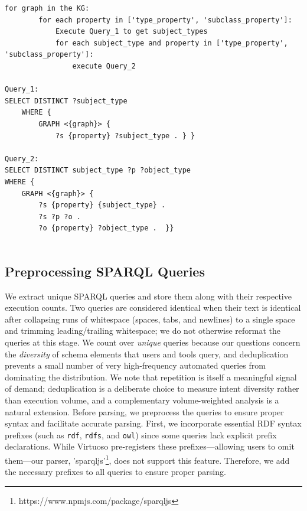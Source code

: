 \documentclass[sw]{iosart2x}
\begin{document}
\begin{center}
\begin{minipage}{0.76\textwidth} %
\begin{lstlisting}[label={lst:l2},caption={Pseudocode to extract KG schema. KG schema extraction is consist of two queries, Query 1 and Query 2.}]
for graph in the KG:
        for each property in ['type_property', 'subclass_property']:
            Execute Query_1 to get subject_types
            for each subject_type and property in ['type_property', 'subclass_property']:
                execute Query_2 
                
Query_1:
SELECT DISTINCT ?subject_type
    WHERE {
        GRAPH <{graph}> {
            ?s {property} ?subject_type . } }

Query_2:
SELECT DISTINCT subject_type ?p ?object_type
WHERE {
    GRAPH <{graph}> {
        ?s {property} {subject_type} .
        ?s ?p ?o .
        ?o {property} ?object_type .  }} 
                    
\end{lstlisting}
\end{minipage}
\end{center}

\subsection{Preprocessing SPARQL Queries}

We extract unique SPARQL queries and store them along with their respective execution counts. Two queries are considered identical when their text is identical after collapsing runs of whitespace (spaces, tabs, and newlines) to a single space and trimming leading/trailing whitespace; we do not otherwise reformat the queries at this stage. We count over \emph{unique} queries because our questions concern the \emph{diversity} of schema elements that users and tools query, and deduplication prevents a small number of very high-frequency automated queries from dominating the distribution. We note that repetition is itself a meaningful signal of demand; deduplication is a deliberate choice to measure intent diversity rather than execution volume, and a complementary volume-weighted analysis is a natural extension. Before parsing, we preprocess the queries to ensure proper syntax and facilitate accurate parsing. First, we incorporate essential RDF syntax prefixes (such as \texttt{rdf}, \texttt{rdfs}, and \texttt{owl}) since some queries lack explicit prefix declarations. While Virtuoso pre-registers these prefixes—allowing users to omit them—our parser, 'sparqljs'\footnote{https://www.npmjs.com/package/sparqljs}, does not support this feature. Therefore, we add the necessary prefixes to all queries to ensure proper parsing.
\end{document}
